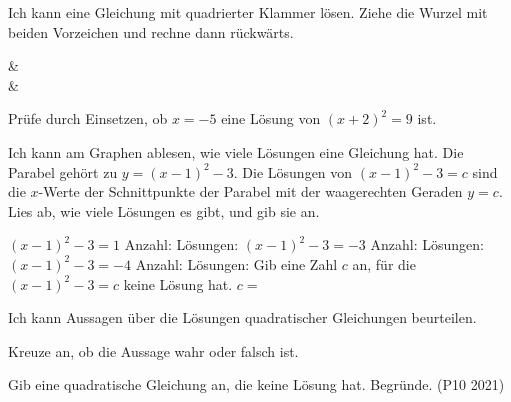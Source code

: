 \begin{aufgabe}{Ich kann eine Gleichung mit quadrierter Klammer lösen. Ziehe die Wurzel mit beiden Vorzeichen und rechne dann rückwärts.}
\begin{gleichungsraster}[2]
 &  \\ \noalign{\vspace{6pt}}
 &  \\ \noalign{\vspace{6pt}}
\end{gleichungsraster}
\medskip
\begin{teile}
\teil Prüfe durch Einsetzen, ob $x = -5$ eine Lösung von $(x + 2)^2 = 9$ ist. \hfill {}
\end{teile}
\end{aufgabe}

\begin{aufgabe}{Ich kann am Graphen ablesen, wie viele Lösungen eine Gleichung hat. Die Parabel gehört zu $y = (x - 1)^2 - 3$. Die Lösungen von $(x - 1)^2 - 3 = c$ sind die $x$-Werte der Schnittpunkte der Parabel mit der waagerechten Geraden $y = c$. Lies ab, wie viele Lösungen es gibt, und gib sie an.}

\begin{ksys}[xmin=-3,xmax=5,ymin=-5,ymax=5,ablesen]
\end{ksys}

\begin{teile}
\teil $(x - 1)^2 - 3 = 1$ \hfill Anzahl: \leerfeld Lösungen: \leerfeld
\teil $(x - 1)^2 - 3 = -3$ \hfill Anzahl: \leerfeld Lösungen: \leerfeld
\teil $(x - 1)^2 - 3 = -4$ \hfill Anzahl: \leerfeld Lösungen: \leerfeld
\teil Gib eine Zahl $c$ an, für die $(x - 1)^2 - 3 = c$ keine Lösung hat. \hfill $c = $ \leerfeld
\end{teile}
\end{aufgabe}

\begin{aufgabe}{Ich kann Aussagen über die Lösungen quadratischer Gleichungen beurteilen.}
\begin{teile}
\teil Kreuze an, ob die Aussage wahr oder falsch ist.
\end{teile}
\begin{teile}
\teil Gib eine quadratische Gleichung an, die keine Lösung hat. Begründe. (P10 2021)
\end{teile}
\end{aufgabe}

